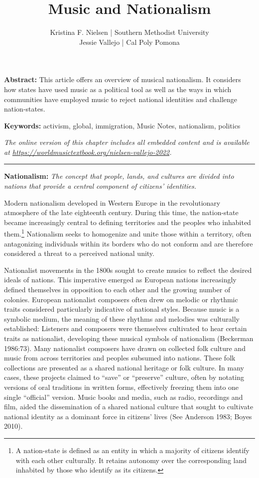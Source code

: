 \documentclass[twoside]{article}
\title{Music and Nationalism}
\author{Kristina F. Nielsen | Southern Methodist University\\Jessie Vallejo | Cal Poly Pomona}
\date{}
\makeatletter
\renewcommand{\maketitle}{\bgroup\setlength{\parindent}{0pt}
\begin{flushleft}
  \vspace*{3\baselineskip}
  \huge{\textbf{\@title}}

  \medskip
  
  \large{\@author}
\end{flushleft}\egroup
}
\providecommand{\abstracttext}[1]
{
  \noindent
  \textbf{Abstract:} #1
}
\providecommand{\keywords}[1]
{
  \newline
  \textbf{Keywords:} #1
}
\providecommand{\wmturl}{\href{https://worldmusictextbook.org/nielsen-vallejo-2022}{https://worldmusictextbook.org/nielsen-vallejo-2022}}
\providecommand{\wmturltext}{
  \noindent\emph{The online version of this chapter includes all embedded content and is available at \wmturl.}
}
\makeatother
\begin{document}
\suppressfloats %
\maketitle

\abstracttext{This article offers an overview of musical nationalism. It considers how states have used music as a political tool as well as the ways in which communities have employed music to reject national identities and challenge nation-states.}
\keywords{activism, global, immigration, Music Notes, nationalism, politics}

\smallskip

\wmturltext

\medskip

\noindent\hfil\rule{0.5\textwidth}{0.4pt}\hfil

\bigskip

\noindent\textbf{Nationalism:} \emph{The concept that people, lands, and cultures
are divided into nations that provide a central component of citizens'
identities.}

\bigskip

Modern nationalism developed in Western Europe in the revolutionary
atmosphere of the late eighteenth century. During this time, the
nation-state became increasingly central to defining territories and the
peoples who inhabited them.\footnote{A nation-state is defined as an
  entity in which a majority of citizens identify with each other
  culturally. It retains autonomy over the corresponding land inhabited
  by those who identify as its citizens.} Nationalism seeks to
homogenize and unite those within a territory, often antagonizing
individuals within its borders who do not conform and are therefore
considered a threat to a perceived national unity.

\sloppy
Nationalist movements in the 1800s sought to create musics to reflect
the desired ideals of nations. This imperative emerged as European
nations increasingly defined themselves in opposition to each
other and the growing number of colonies. European nationalist composers
often drew on melodic or rhythmic traits considered particularly
indicative of national styles. Because music is a symbolic medium, the
meaning of these rhythms and melodies was culturally established:
Listeners and composers were themselves cultivated to hear certain
traits as nationalist, developing these musical symbols of nationalism
(Beckerman 1986:73). Many nationalist composers have drawn on collected
folk culture and music from across territories and peoples subsumed into
nations. These folk collections are presented as a shared national
heritage or folk culture. In many cases, these projects claimed to
``save'' or ``preserve'' culture, often by notating versions of oral
traditions in written forms, effectively freezing them into one single
``official'' version. Music books and media, such as radio, recordings
and film, aided the dissemination of a shared national culture that
sought to cultivate national identity as a dominant force in citizens'
lives (See Anderson 1983; Boyes 2010).
\end{document}
